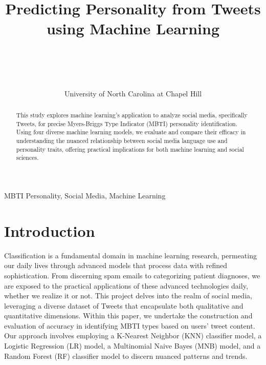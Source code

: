 \documentclass[pmlr,twocolumn]{jmlr} %
\title[Predicting MBTI from Tweets]{Predicting Personality from Tweets using Machine Learning}
\author{%
  \Name{Nathan Holmes} \Email{nholmes@email.unc.edu}\\
  \Name{Namita Krishna} \Email{namitak@email.unc.edu}\\
  \Name{Andrew Mu} \Email{andylmu@email.unc.edu}\\
  \Name{Nabeel Rahman} \Email{nrahman@unc.edu}\\
  \addr University of North Carolina at Chapel Hill
 }
\begin{document}
\maketitle

\begin{abstract}
This study explores machine learning's application to analyze social media, specifically Tweets, for precise Myers-Briggs Type Indicator (MBTI) personality identification. Using four diverse machine learning models, we evaluate and compare their efficacy in understanding the nuanced relationship between social media language use and personality traits, offering practical implications for both machine learning and social sciences.
\end{abstract}
\begin{keywords}
  MBTI Personality, Social Media, Machine Learning
\end{keywords}

\section{Introduction}
\label{sec:intro}
Classification is a fundamental domain in machine learning research, permeating our daily lives through advanced models that process data with refined sophistication. From discerning spam emails to categorizing patient diagnoses, we are exposed to the practical applications of these advanced technologies daily, whether we realize it or not. This project delves into the realm of social media, leveraging a diverse dataset of Tweets that encapsulate both qualitative and quantitative dimensions. Within this paper, we undertake the construction and evaluation of accuracy in identifying MBTI types based on users' tweet content. Our approach involves employing a K-Nearest Neighbor (KNN) classifier model, a Logistic Regression (LR) model, a Multinomial Naive Bayes (MNB) model, and a Random Forest (RF) classifier model to discern nuanced patterns and trends.
\end{document}
